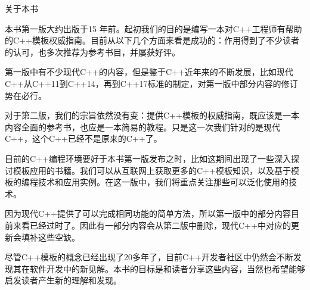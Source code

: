 \begin{flushright}
 关于本书
\end{flushright}

本书第一版大约出版于15 年前。起初我们的目的是编写一本对C++工程师有帮助的C++模板权威指南。目前从以下几个方面来看是成功的：作用得到了不少读者的认可，也多次推荐为参考书目，并屡获好评。

第一版中有不少现代C++的内容，但是鉴于C++近年来的不断发展，比如现代C++从C++11到C++14，再到C++17标准的制定，对第一版中部分内容的修订势在必行。

对于第二版，我们的宗旨依然没有变：提供C++模板的权威指南，既应该是一本内容全面的参考书，也应是一本简易的教程。只是这一次我们针对的是现代C++，这个C++已经不是原来的C++了。

目前的C++编程环境要好于本书第一版发布之时，比如这期间出现了一些深入探讨模板应用的书籍。我们可以从互联网上获取更多的C++模板知识，以及基于模板的编程技术和应用实例。在这一版中，我们将重点关注那些可以泛化使用的技术。

因为现代C++提供了可以完成相同功能的简单方法，所以第一版中的部分内容目前来看已经过时了。因此有一部分内容会从第二版中删除，现代C++中对应的更新会填补这些空缺。

尽管C++模板的概念已经出现了20多年了，目前C++开发者社区中仍然会不断发现其在软件开发中的新见解。本书的目标是和读者分享这些内容，当然也希望能够启发读者产生新的理解和发现。
